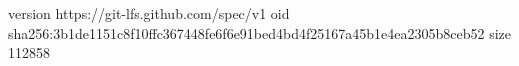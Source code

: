 version https://git-lfs.github.com/spec/v1
oid sha256:3b1de1151c8f10ffc367448fe6f6e91bed4bd4f25167a45b1e4ea2305b8ceb52
size 112858
